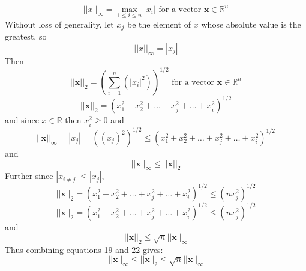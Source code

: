 \documentclass{article} %
\begin{document}
\begin{equation}
||x||_\infty = \max_{1 \leq i \leq n} |x_i| \mbox{ for a vector } \boldsymbol{x} \in \mathbb{R}^n 
\end{equation}
Without loss of generality, let $x_j$ be the element of $x$ whose absolute value is the greatest, so 
\begin{equation} 
||x||_\infty = |x_j|
\end{equation} 
Then 
\begin{equation}
||\boldsymbol{x}||_2 = (\sum_{i=1}^n (|x_i|^2))^{1/2} \mbox{ for a vector } \boldsymbol{x} \in \mathbb{R}^n 
\end{equation}
\begin{equation}
||\boldsymbol{x}||_2 = (x_1^2 + x_2^2 + \ldots + x_j^2 + \ldots + x_i^2)^{1/2} 
\end{equation}
and since $x \in \mathbb{R}$ then $x_i^2 \geq 0$ and 
\begin{equation} 
||\boldsymbol{x}||_\infty = |x_j| = ((x_j)^2)^{1/2} \leq (x_1^2 + x_2^2 + \ldots + x_j^2 + \ldots + x_i^2)^{1/2}
\end{equation} 
and 
\begin{equation} 
||\boldsymbol{x}||_\infty \leq ||\boldsymbol{x}||_2
\end{equation} 
Further since $|x_{i \neq j}| \leq |x_j|$, 
\begin{equation}
||\boldsymbol{x}||_2 = (x_1^2 + x_2^2 + \ldots + x_j^2 + \ldots + x_i^2)^{1/2}  \leq (n x_j^2)^{1/2}
\end{equation}
\begin{equation}
||\boldsymbol{x}||_2 = (x_1^2 + x_2^2 + \ldots + x_j^2 + \ldots + x_i^2)^{1/2}  \leq (n x_j^2)^{1/2}
\end{equation}
and 
\begin{equation}
||\boldsymbol{x}||_2 \leq \sqrt{n} ||\boldsymbol{x}||_\infty
\end{equation}
Thus combining equations 19 and 22 gives:
\begin{equation}
||\boldsymbol{x}||_\infty \leq ||\boldsymbol{x}||_2 \leq \sqrt{n} ||\boldsymbol{x}||_\infty
\end{equation}
\\
\end{document}
